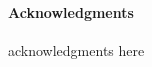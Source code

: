\documentclass[runningheads,orivec]{llncs}
\date{\today}					%
\def\acknowledgmenttext{
	acknowledgments here
}
\begin{document}







\checkfornotes
\ifnum{}
	\ifnum{}
		\paragraph{Acknowledgments}
		\acknowledgmenttext
	\fi
\fi
\ifnum{}
	
\else
	
\fi
\appendix




\end{document}
